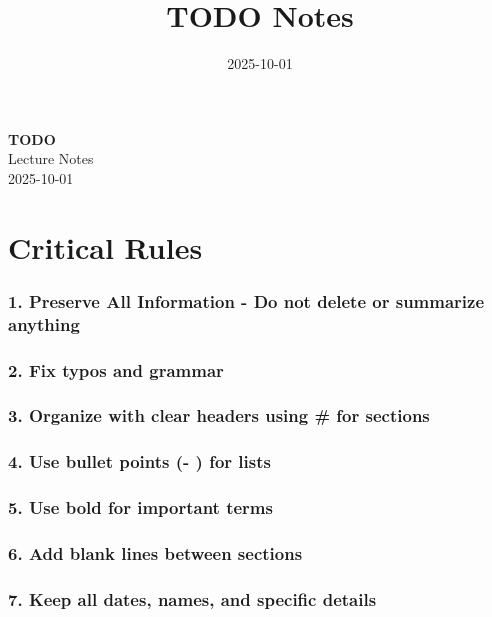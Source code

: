 \documentclass[11pt,a4paper]{article}
\title{\textcolor{primarycolor}{\Huge\textbf{TODO Notes}}}
\author{}
\date{\textcolor{secondarycolor}{2025-10-01}}
\begin{document}
\begin{center}
    \colorbox{secondarycolor!10}{%
        \parbox{0.95\textwidth}{%
            \centering
            \vspace{0.5cm}
            {\Huge\textcolor{primarycolor}{\textbf{TODO}}} \\[0.5cm]
            {\Large Lecture Notes} \\[0.3cm]
            {\large\textcolor{secondarycolor}{2025-10-01}}
            \vspace{0.5cm}
        }
    }
\end{center}

\vspace{1cm}

\section*{Critical Rules}
\subsubsection*{1. Preserve All Information - Do not delete or summarize anything}

\subsubsection*{2. Fix typos and grammar}

\subsubsection*{3. Organize with clear headers using # for sections}

\subsubsection*{4. Use bullet points (- ) for lists}

\subsubsection*{5. Use \textbf{bold} for important terms}

\subsubsection*{6. Add blank lines between sections}

\subsubsection*{7. Keep all dates, names, and specific details}
\end{document}

